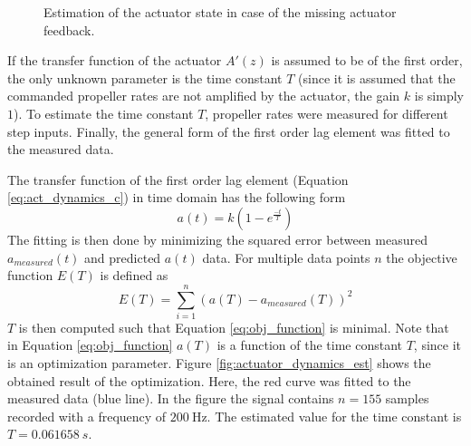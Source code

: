 \documentclass[11pt, a4paper, twoside]{report}
\begin{document}
\begin{figure}[H]
	\centering 
	\captionsetup{justification=centering, singlelinecheck=off, font=bf, belowskip=-0.5cm}
	\caption[Estimation of the actuator state in case of the missing actuator feedback]{Estimation of the actuator state in case of the missing actuator feedback.}
	\label{fig:actuator}
\end{figure}

If the transfer function of the actuator $A'(z)$ is assumed to be of the first order, the only unknown parameter is the time constant $T$ (since it is assumed that the commanded propeller rates are not amplified by the actuator, the gain $k$ is simply $1$). To estimate the time constant $T$, propeller rates were measured for different step inputs. Finally, the general form of the first order lag element was fitted to the measured data. 

The transfer function of the first order lag element (Equation \ref{eq:act_dynamics_c}) in time domain has the following form 
\begin{equation}
	a(t) = 	k (1 - e^{\frac{-t}{T}})
	\label{eq:act_dynamics_time}
\end{equation}
The fitting is then done by minimizing the squared error between measured $a_{measured}(t)$ and predicted $a(t)$ data. For multiple data points $n$ the objective function $E(T)$ is defined as 
\begin{equation}
	E(T) = \sum_{i=1}^{n} (a(T) - a_{measured}(T))^2
	\label{eq:obj_function}
\end{equation}
$T$ is then computed such that Equation \ref{eq:obj_function} is minimal. Note that in Equation \ref{eq:obj_function} $a(T)$ is a function of the time constant $T$, since it is an optimization parameter. Figure \ref{fig:actuator_dynamics_est} shows the obtained result of the optimization. Here, the red curve was fitted to the measured data (blue line). In the figure the signal contains $n=155$ samples recorded with a frequency of $200~\si{\Hz}$. The estimated value for the time constant is $T = 0.061658 \ s$.
	
\end{document}
